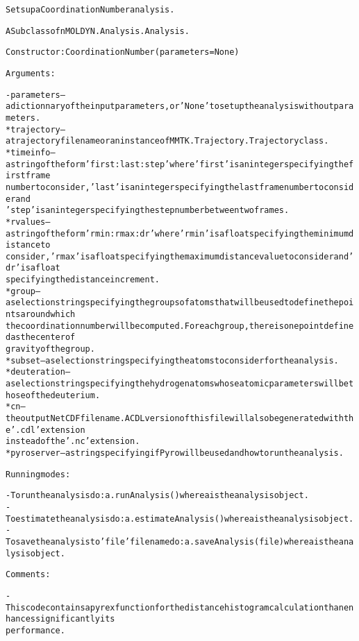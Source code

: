 \begin{alltt}
Sets up a Coordination Number analysis.

A Subclass of nMOLDYN.Analysis.Analysis. 

Constructor: CoordinationNumber({\textbar}parameters{\textbar} = None)

Arguments:

    - {\textbar}parameters{\textbar} -- a dictionnary of the input parameters, or 'None' to set up the analysis without parameters.
        * trajectory  -- a trajectory file name or an instance of MMTK.Trajectory.Trajectory class.
        * timeinfo    -- a string of the form 'first:last:step' where 'first' is an integer specifying the first frame 
                         number to consider, 'last' is an integer specifying the last frame number to consider and 
                         'step' is an integer specifying the step number between two frames.
        * rvalues     -- a string of the form 'rmin:rmax:dr' where 'rmin' is a float specifying the minimum distance to 
                         consider, 'rmax' is a float specifying the maximum distance value to consider and 'dr' is a float
                         specifying the distance increment. 
        * group       -- a selection string specifying the groups of atoms that will be used to define the points around which 
                         the coordination number will be computed. For each group, there is one point defined as the center of 
                         gravity of the group.
        * subset      -- a selection string specifying the atoms to consider for the analysis.
        * deuteration -- a selection string specifying the hydrogen atoms whose atomic parameters will be those of the deuterium.
        * cn          -- the output NetCDF file name. A CDL version of this file will also be generated with the '.cdl' extension
                         instead of the '.nc' extension.
        * pyroserver  -- a string specifying if Pyro will be used and how to run the analysis.

Running modes:

    - To run the analysis do: a.runAnalysis() where a is the analysis object.
    - To estimate the analysis do: a.estimateAnalysis() where a is the analysis object.
    - To save the analysis to 'file' file name do: a.saveAnalysis(file) where a is the analysis object.

Comments:        
    
    - This code contains a pyrex function for the distance histogram calculation than enhances significantly its 
      performance.
\end{alltt}



